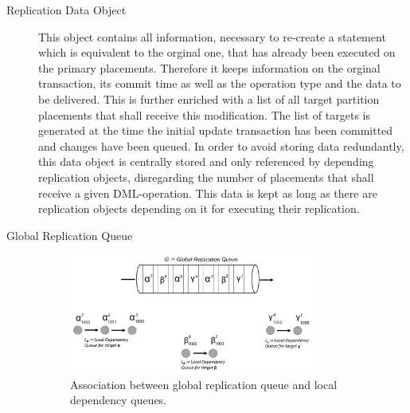 \begin{description}

    \item[Replication Data Object] This object contains all information, necessary to re-create a statement which is equivalent to the orginal one,
    that has already been executed on the primary placements. 
    Therefore it keeps information on the orginal transaction, its commit time as well as the operation type and the data to be delivered. 
    This is further enriched with a list of all target partition placements that shall receive this modification. The list of targets is generated
    at the time the initial update transaction has been committed and changes have been queued. In order to avoid storing data redundantly, this data object 
    is centrally stored and only referenced by depending replication objects, disregarding the number of placements that shall receive a given DML-operation.
    This data is kept as long as there are replication objects depending on it for executing their replication.


    \item[Global Replication Queue] 
    
    \begin{figure}[t]
        \centering
        \includegraphics[width=0.8\textwidth]{Figures/Queue.png}
        \caption{Association between global replication queue and local dependency queues.}
        \label{fig:queue}
    \end{figure}
  

\end{description}
